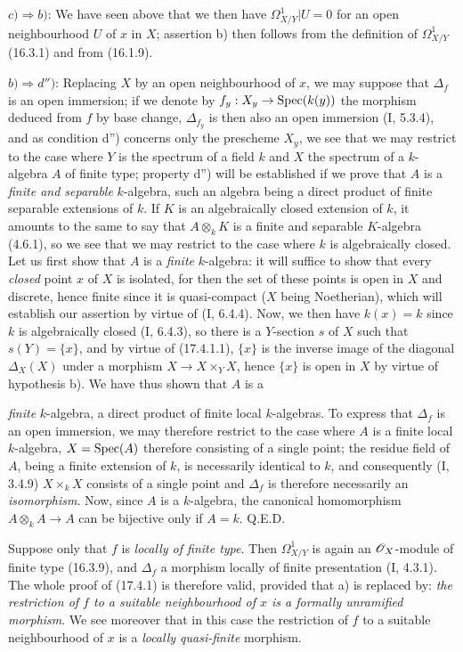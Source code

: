 $c)\Rightarrow b)$: We have seen above that we then have $\Omega^1_{X/Y}|U=0$ for an open neighbourhood $U$ of $x$ in $X$; assertion b) then follows from the definition of $\Omega^1_{X/Y}$ (16.3.1) and from (16.1.9).

$b)\Rightarrow d'')$: Replacing $X$ by an open neighbourhood of $x$, we may suppose that $\Delta_f$ is an open immersion; if we denote by $f_y:X_y\to\operatorname{Spec}(k(y))$ the morphism deduced from $f$ by base change, $\Delta_{f_y}$ is then also an open immersion (I, 5.3.4), and as condition d'') concerns only the prescheme $X_y$, we see that we may restrict to the case where $Y$ is the spectrum of a field $k$ and $X$ the spectrum of a $k$-algebra $A$ of finite type; property d'') will be established if we prove that $A$ is a \emph{finite and separable} $k$-algebra, such an algebra being a direct product of finite separable extensions of $k$. If $K$ is an algebraically closed extension of $k$, it amounts to the same to say that $A\otimes_k K$ is a finite and separable $K$-algebra (4.6.1), so we see that we may restrict to the case where $k$ is algebraically closed. Let us first show that $A$ is a \emph{finite} $k$-algebra: it will suffice to show that every \emph{closed} point $x$ of $X$ is isolated, for then the set of these points is open in $X$ and discrete, hence finite since it is quasi-compact ($X$ being Noetherian), which will establish our assertion by virtue of (I, 6.4.4). Now, we then have $k(x)=k$ since $k$ is algebraically closed (I, 6.4.3), so there is a $Y$-section $s$ of $X$ such that $s(Y)=\{x\}$, and by virtue of (17.4.1.1), $\{x\}$ is the inverse image of the diagonal $\Delta_X(X)$ under a morphism $X\to X\times_Y X$, hence $\{x\}$ is open in $X$ by virtue of hypothesis b). We have thus shown that $A$ is a

\emph{finite} $k$-algebra, a direct product of finite local $k$-algebras. To express that $\Delta_f$ is an open immersion, we may therefore restrict to the case where $A$ is a finite local $k$-algebra, $X=\operatorname{Spec}(A)$ therefore consisting of a single point; the residue field of $A$, being a finite extension of $k$, is necessarily identical to $k$, and consequently (I, 3.4.9) $X\times_k X$ consists of a single point and $\Delta_f$ is therefore necessarily an \emph{isomorphism}. Now, since $A$ is a $k$-algebra, the canonical homomorphism $A\otimes_k A\to A$ can be bijective only if $A=k$. Q.E.D.

\begin{remark}[17.4.1.2]
\label{IV.17.4.1.2}
Suppose only that $f$ is \emph{locally of finite type}. Then $\Omega^1_{X/Y}$ is again an $\mathscr{O}_X$-module of finite type (16.3.9), and $\Delta_f$ a morphism locally of finite presentation (I, 4.3.1). The whole proof of (17.4.1) is therefore valid, provided that a) is replaced by: \emph{the restriction of $f$ to a suitable neighbourhood of $x$ is a formally unramified morphism}. We see moreover that in this case the restriction of $f$ to a suitable neighbourhood of $x$ is a \emph{locally quasi-finite} morphism.
\end{remark}

